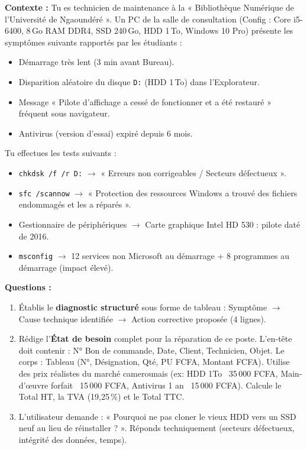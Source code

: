 \documentclass[11pt]{article}
\newcounter{popsec}
\newcounter{popsub}
\newcommand{\courssub}[1]{%
  \stepcounter{popsub}%
  \par\vspace{9pt}\noindent{\popxbold\fontsize{11.5}{13}\selectfont\color{popink}{\color{poporange}\thepopsec.\thepopsub}\hspace{6pt}#1}\par\nopagebreak\vspace{4pt}
}
\begin{document}
\courssub{Je me prépare au Probatoire}

\begin{exercice}
\textbf{Contexte :} Tu es technicien de maintenance à la « Bibliothèque Numérique de l'Université de Ngaoundéré ». Un PC de la salle de consultation (Config : Core i5-6400, 8\,Go RAM DDR4, SSD 240\,Go, HDD 1\,To, Windows 10 Pro) présente les symptômes suivants rapportés par les étudiants :
\begin{itemize}
    \item Démarrage très lent (3 min avant Bureau).
    \item Disparition aléatoire du disque \texttt{D:} (HDD 1\,To) dans l'Explorateur.
    \item Message « Pilote d'affichage a cessé de fonctionner et a été restauré » fréquent sous navigateur.
    \item Antivirus (version d'essai) expiré depuis 6 mois.
\end{itemize}
Tu effectues les tests suivants :
\begin{itemize}
    \item \texttt{chkdsk /f /r D:} $\rightarrow$ « Erreurs non corrigeables / Secteurs défectueux ».
    \item \texttt{sfc /scannow} $\rightarrow$ « Protection des ressources Windows a trouvé des fichiers endommagés et les a réparés ».
    \item Gestionnaire de périphériques $\rightarrow$ Carte graphique Intel HD 530 : pilote daté de 2016.
    \item \texttt{msconfig} $\rightarrow$ 12 services non Microsoft au démarrage + 8 programmes au démarrage (impact élevé).
\end{itemize}

\textbf{Questions :}
\begin{enumerate}
    \item Établis le \textbf{diagnostic structuré} sous forme de tableau : Symptôme $\rightarrow$ Cause technique identifiée $\rightarrow$ Action corrective proposée (4 lignes).
    \item Rédige l'\textbf{État de besoin} complet pour la réparation de ce poste. L'en-tête doit contenir : N° Bon de commande, Date, Client, Technicien, Objet. Le corps : Tableau (N°, Désignation, Qté, PU FCFA, Montant FCFA). Utilise des prix réalistes du marché camerounais (ex: HDD 1To ~35\,000 FCFA, Main-d'œuvre forfait ~15\,000 FCFA, Antivirus 1 an ~15\,000 FCFA). Calcule le Total HT, la TVA (19,25\,\%) et le Total TTC.
    \item L'utilisateur demande : « Pourquoi ne pas cloner le vieux HDD vers un SSD neuf au lieu de réinstaller ? ». Réponds techniquement (secteurs défectueux, intégrité des données, temps).
\end{enumerate}
\end{exercice}
\end{document}
